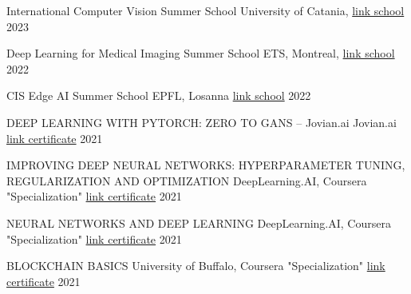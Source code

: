 

\begin{cvhonors}
  \cvhonor
    {International Computer Vision Summer School} %
    {University of Catania, \href{https://iplab.dmi.unict.it/icvss2023/}{link school}} %
    {} %
    {2023} %
    
  \cvhonor
    {Deep Learning for Medical Imaging Summer School} %
    {ETS, Montreal, \href{https://event.fourwaves.com/dlmi2022/pages}{link school}} %
    {} %
    {2022} %
    
  \cvhonor
    {CIS Edge AI Summer School} %
    {EPFL, Losanna \href{https://www.epfl.ch/research/domains/cis/center-for-intelligent-systems-cis/events/cis-edge-ai-summer-school/}{link school}} %
    {} %
    {2022} %
    
  \cvhonor
    {DEEP LEARNING WITH PYTORCH: ZERO TO GANS – Jovian.ai} %
    {Jovian.ai \href{https://jovian.com/certificate/MFQTINJVGA}{link certificate}} %
    {} %
    {2021} %

  \cvhonor
    {IMPROVING DEEP NEURAL NETWORKS: HYPERPARAMETER TUNING, REGULARIZATION AND OPTIMIZATION} %
    {DeepLearning.AI, Coursera "Specialization" \href{https://www.coursera.org/account/accomplishments/verify/HRA43JLWKNAT}{link certificate}} %
    {} %
    {2021} %

  \cvhonor
    {NEURAL NETWORKS AND DEEP LEARNING} %
    {DeepLearning.AI, Coursera "Specialization" \href{https://www.coursera.org/account/accomplishments/verify/F9BLUEYK3HUN}{link certificate}} %
    {} %
    {2021} %

  \cvhonor
    {BLOCKCHAIN BASICS} %
    {University of Buffalo, Coursera "Specialization" \href{https://www.coursera.org/account/accomplishments/verify/GKL4ZULKLE4U}{link certificate}} %
    {} %
    {2021} %

\end{cvhonors}
